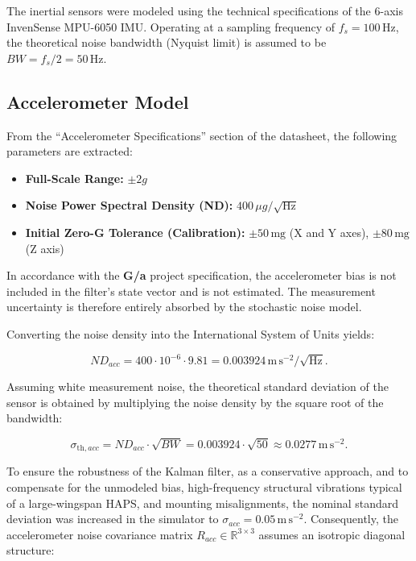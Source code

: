 \documentclass[a4paper,twoside,openany]{report}
\begin{document}
The inertial sensors were modeled using the technical specifications of the 6-axis InvenSense MPU-6050 IMU. Operating at a sampling frequency of $f_s = 100\,\mathrm{Hz}$, the theoretical noise bandwidth (Nyquist limit) is assumed to be $BW = f_s/2 = 50\,\mathrm{Hz}$.

\subsection{Accelerometer Model}

From the ``Accelerometer Specifications'' section of the datasheet, the following parameters are extracted:

\begin{itemize}
    \item \textbf{Full-Scale Range:} $\pm 2g$
    \item \textbf{Noise Power Spectral Density (ND):} $400\,\mu g/\sqrt{\mathrm{Hz}}$
    \item \textbf{Initial Zero-G Tolerance (Calibration):} $\pm 50\,\mathrm{mg}$ (X and Y axes), $\pm 80\,\mathrm{mg}$ (Z axis)
\end{itemize}

In accordance with the \textbf{G/a} project specification, the accelerometer bias is not included in the filter's state vector and is not estimated. The measurement uncertainty is therefore entirely absorbed by the stochastic noise model.

Converting the noise density into the International System of Units yields:

\begin{equation}
    ND_{acc} = 400 \cdot 10^{-6} \cdot 9.81 = 0.003924\,\mathrm{m\,s^{-2}/\sqrt{Hz}}.
\end{equation}

Assuming white measurement noise, the theoretical standard deviation of the sensor is obtained by multiplying the noise density by the square root of the bandwidth:

\begin{equation}
    \sigma_{\mathrm{th},acc} = ND_{acc} \cdot \sqrt{BW} = 0.003924 \cdot \sqrt{50} \approx 0.0277\,\mathrm{m\,s^{-2}}.
\end{equation}

To ensure the robustness of the Kalman filter, as a conservative approach, and to compensate for the unmodeled bias, high-frequency structural vibrations typical of a large-wingspan HAPS, and mounting misalignments, the nominal standard deviation was increased in the simulator to $\sigma_{acc} = 0.05\,\mathrm{m\,s^{-2}}$. Consequently, the accelerometer noise covariance matrix $R_{acc} \in \mathbb{R}^{3 \times 3}$ assumes an isotropic diagonal structure:
\end{document}
